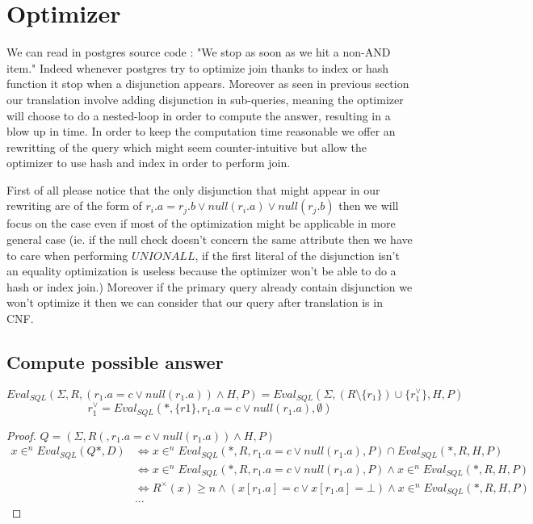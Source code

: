 \section{Optimizer}

We can read in postgres source code : "We stop as soon as we hit a non-AND item." Indeed whenever postgres try to optimize join thanks to index or hash function it stop when a disjunction appears.
Moreover as seen in previous section our translation involve adding disjunction in sub-queries, meaning the optimizer will choose to do a nested-loop in order to compute the answer, resulting in a blow up in time.
In order to keep the computation time reasonable we offer an rewritting of the query which might seem counter-intuitive but allow the optimizer to use hash and index in order to perform join.

First of all please notice that the only disjunction that might appear in our rewriting are of the form of $r_i.a = r_j.b \lor null(r_i.a) \lor null(r_j.b)$ then we will focus on the case even if most of the optimization might be applicable in more general case (ie. if the null check doesn't concern the same attribute then we have to care when performing $UNION ALL$, if the first literal of the disjunction isn't an equality optimization is useless because the optimizer won't be able to do a hash or index join.)
Moreover if the primary query already contain disjunction we won't optimize it then we can consider that our query after translation is in CNF.  

\subsection{Compute possible answer}
\begin{myprop}
	$$Eval_{SQL}(\Sigma,R,(r_1.a = c \lor null(r_1.a))\land H,P) =  Eval_{SQL}(\Sigma,(R\setminus \{r_1\}) \cup \{r_1^\lor\},H,P)$$
	$$r_1^\lor = Eval_{SQL}(*,\{r1\},r_1.a = c \lor null(r_1.a),\emptyset )$$
\end{myprop}
\begin{proof}
	$Q = (\Sigma,R(,r_1.a = c \lor null(r_1.a))\land H,P) $
	\begin{align*}
		x \in^n Eval_{SQL}(Q*,D) & \Leftrightarrow x \in^n Eval_{SQL}(*,R,r_1.a=c \lor null(r_1.a),P)\cap Eval_{SQL}(*,R,H,P)\\
		& \Leftrightarrow x \in^n Eval_{SQL}(*,R,r_1.a=c \lor null(r_1.a),P) \land x \in^n Eval_{SQL}(*,R,H,P)\\
		& \Leftrightarrow R^\times(x) \geq n \land (x[r_1.a] = c \lor x[r_1.a] = \bot) \land  x \in^n Eval_{SQL}(*,R,H,P)\\
		& ...
		\end{align*}
\end{proof}

